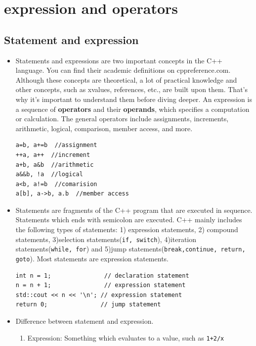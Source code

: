 \documentclass[a4paper,11pt,twoside]{book}
\begin{document}
\section{expression and operators}

\subsection{Statement and expression}
\begin{itemize}
	\item Statements and expressions are two important concepts in the C++ language. You can find their academic definitions on cppreference.com. Although these concepts are theoretical, a lot of practical knowledge and other concepts, such as xvalues, references, etc., are built upon them. That's why it's important to understand them before diving deeper. An expression is a sequence of \textbf{operators} and their \textbf{operands}, which specifies a computation or calculation. The general operators include assignments, increments, arithmetic, logical, comparison, member access, and more.

\begin{lstlisting}[numbers=none]
a=b, a+=b  //assignment
++a, a++  //increment
a+b, a&b  //arithmetic
a&&b, !a  //logical
a<b, a!=b  //comarision
a[b], a->b, a.b  //member access	
\end{lstlisting}
	
	
	\item Statements are fragments of the C++ program that are executed in sequence. Statements which ends with semicolon are executed. C++ mainly includes the following types of statements: 1) expression statements, 2) compound statements, 3)selection statements(\texttt{if, switch}), 4)iteration statements(\texttt{while, for}) and 5)jump statements(\texttt{break,continue, return, goto}). Most statements are expression statements.

\begin{lstlisting}[numbers=none]
int n = 1;               // declaration statement
n = n + 1;               // expression statement
std::cout << n << '\n'; // expression statement
return 0;               // jump statement
\end{lstlisting}
	
	
	\item Difference between statement and expression.
	\begin{enumerate}
		\item Expression: Something which evaluates to a value, such as \texttt{1+2/x}
		

\end{enumerate}
\end{itemize}
\end{document}

